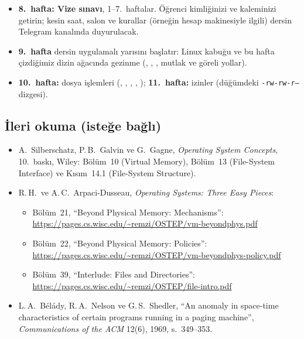 \begin{itemize}
  \item \textbf{8.\ hafta: Vize sınavı}, 1--7.\ haftalar. Öğrenci kimliğinizi ve kaleminizi getirin; kesin saat, salon ve kurallar (örneğin hesap makinesiyle ilgili) dersin Telegram kanalında duyurulacak.
  \item \textbf{9.\ hafta} dersin uygulamalı yarısını başlatır: Linux kabuğu ve bu hafta çizdiğimiz dizin ağacında gezinme (, , , mutlak ve göreli yollar).
  \item \textbf{10.\ hafta:} dosya işlemleri (, , , , ); \textbf{11.\ hafta:} izinler (düğümdeki \texttt{-rw-rw-r--} dizgesi).
\end{itemize}

\subsection*{İleri okuma (isteğe bağlı)}
\begin{itemize}
  \item A.\ Silberschatz, P.\,B.\ Galvin ve G.\ Gagne, \emph{Operating System Concepts}, 10.\ baskı, Wiley: Bölüm~10 (Virtual Memory), Bölüm~13 (File-System Interface) ve Kısım~14.1 (File-System Structure).
  \item R.\,H.\ ve A.\,C.\ Arpaci-Dusseau, \emph{Operating Systems: Three Easy Pieces}:
  \begin{itemize}
    \item Bölüm~21, ``Beyond Physical Memory: Mechanisms'': \url{https://pages.cs.wisc.edu/~remzi/OSTEP/vm-beyondphys.pdf}
    \item Bölüm~22, ``Beyond Physical Memory: Policies'': \url{https://pages.cs.wisc.edu/~remzi/OSTEP/vm-beyondphys-policy.pdf}
    \item Bölüm~39, ``Interlude: Files and Directories'': \url{https://pages.cs.wisc.edu/~remzi/OSTEP/file-intro.pdf}
  \end{itemize}
  \item L.\,A.\ Bélády, R.\,A.\ Nelson ve G.\,S.\ Shedler, ``An anomaly in space-time characteristics of certain programs running in a paging machine'', \emph{Communications of the ACM} 12(6), 1969, s.~349--353.
\end{itemize}
